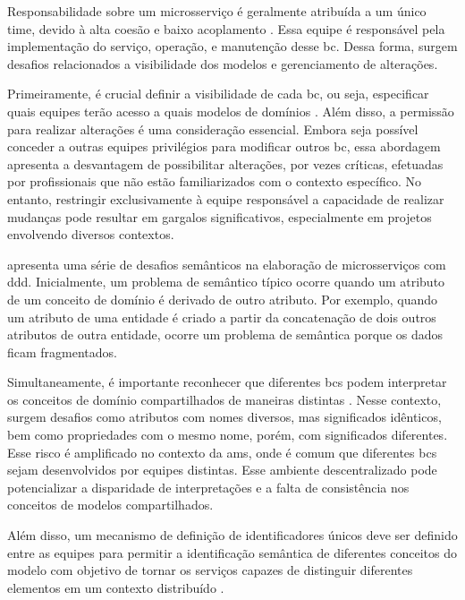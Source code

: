 Responsabilidade sobre um microsserviço é geralmente atribuída a um único time, devido à alta coesão e baixo acoplamento \cite{Rademacher201836}. Essa equipe é responsável pela implementação do serviço, operação,  e manutenção desse \acrfull{bc}. Dessa forma, surgem desafios relacionados a visibilidade dos modelos e gerenciamento de alterações.

Primeiramente, é crucial definir a visibilidade de cada \acrshort{bc}, ou seja, especificar quais equipes terão acesso a quais modelos de domínios \cite{Rademacher201836}. Além disso, a permissão para realizar alterações é uma consideração essencial. Embora seja possível conceder a outras equipes privilégios para modificar outros \acrshort{bc}, essa abordagem apresenta a desvantagem de possibilitar alterações, por vezes críticas, efetuadas por profissionais que não estão familiarizados com o contexto específico. No entanto, restringir exclusivamente à equipe responsável a capacidade de realizar mudanças pode resultar em gargalos significativos, especialmente em projetos envolvendo diversos contextos.

 apresenta uma série de desafios semânticos na elaboração de microsserviços com \acrshort{ddd}. Inicialmente, um problema de semântico típico ocorre quando um atributo de um conceito de domínio é derivado de outro atributo. Por exemplo, quando um atributo de uma entidade é criado a partir da concatenação de dois outros atributos de outra entidade, ocorre um problema de semântica porque os dados ficam fragmentados.

Simultaneamente, é importante reconhecer que diferentes \acrshort{bc}s podem interpretar os conceitos de domínio compartilhados de maneiras distintas \cite{Diepenbrock20171777}. Nesse contexto, surgem desafios como atributos com nomes diversos, mas significados idênticos, bem como propriedades com o mesmo nome, porém, com significados diferentes. Esse risco é amplificado no contexto da \acrshort{ams}, onde é comum que diferentes \acrshort{bc}s sejam desenvolvidos por equipes distintas. Esse ambiente descentralizado pode potencializar a disparidade de interpretações e a falta de consistência nos conceitos de modelos compartilhados.

Além disso, um mecanismo de definição de identificadores únicos deve ser definido entre as equipes para permitir a identificação semântica de diferentes conceitos do modelo com objetivo de tornar os serviços capazes de distinguir diferentes elementos em um contexto distribuído \cite{Diepenbrock20171777}.

